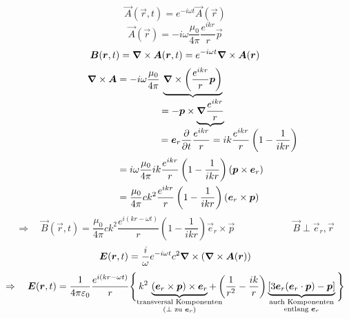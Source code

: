 \begin{equation*}
\vec{A}(\vec{r},t) = e^{- i \omega t} \vec{A}(\vec{r})
\end{equation*}
\begin{equation*}
\vec{A}(\vec{r}) = - i \omega \frac{\mu_0}{4 \pi} \frac{e^{i k r}}{r} \vec{p}
\end{equation*}
\begin{equation*}
\bm{B}(\bm{r},t) = \bm{\nabla} \times \bm{A}(\bm{r},t) = e^{- i \omega t} \bm{\nabla} \times \bm{A}(\bm{r})
\end{equation*}
\begin{align*}
\vabla \times \vec{A} &= - i \omega \frac{\mu_0}{4 \pi} \ub{\vabla \times \left(\frac{e^{ikr}}{r} \vec{p}\right)}_{ \displaystyle = - \vec{p} \times \ub{\vabla \frac{e^{ikr}}{r}}_{\mathclap{\qquad \quad \ \ \, \, \displaystyle = \vec{e}_{r} \prt{}{t} \frac{e^{ikr}}{r} = i k \frac{e^{ikr}}{r} \left(1 - \frac{1}{ikr}\right)}}}\\
&= i \omega \frac{\mu_0}{4 \pi} i k \frac{e^{ikr}}{r} \left(1 - \frac{1}{ikr}\right) (\vec{p} \times \vec{e}_{r})\\
&= \frac{\mu_0}{4 \pi} ck^2 \frac{e^{ikr}}{r} \left(1 - \frac{1}{ikr}\right) (\vec{e}_{r} \times \vec{p})
\end{align*}
\begin{equation*}
\Rightarrow \quad \vec{B}(\vec{r},t) = \frac{\mu_0}{4 \pi} ck^2 \frac{e^{i(kr - \omega t)}}{r} \left(1 - \frac{1}{ikr}\right) \vec{e}_r \times \vec{p} \qquad \qquad \qquad \vec{B} \perp \vec{e}_r , \vec{r}
\end{equation*}
%
%
%
%
%
%
\begin{equation*}
\bm{E}(\bm{r},t) = \frac{i}{\omega} e^{- i \omega t} c^2 \bm{\nabla} \times (\bm{\nabla} \times \bm{A}(\bm{r}))
\end{equation*}
\begin{equation*}
\Rightarrow \quad \vec{E}(\vec{r},t) = \kq \frac{e^{i (kr - \omega t)}}{r} \Bigg\{ \, k^2 \, \ub{(\vec{e}_r \times \vec{p}) \times \vec{e}_r}_{\mathclap{\substack{\tx{transversal Komponenten} \\ (\perp \tx{ zu } \vec{e}_r)}}} + \left(\frac{1}{r^2} - \frac{ik}{r}\right) \ub{\left[3 \vec{e}_r (\vec{e}_r \cdot \vec{p}) - \vec{p}\right]}_{\mathclap{\substack{\tx{auch Komponenten} \\ \tx{entlang } \vec{e}_r}}} \Bigg\}
\end{equation*}

